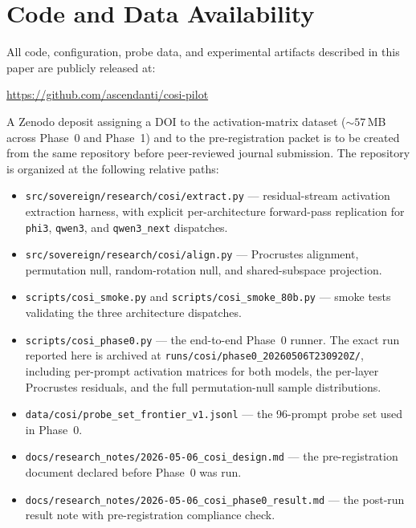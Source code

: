 \section{Code and Data Availability}
\label{sec:availability}

All code, configuration, probe data, and experimental artifacts
described in this paper are publicly released at:
\begin{center}
\url{https://github.com/ascendanti/cosi-pilot}
\end{center}
A Zenodo deposit assigning a DOI to the activation-matrix dataset
($\sim 57$\,MB across Phase~0 and Phase~1) and to the pre-registration
packet is to be created from the same repository before peer-reviewed
journal submission. The repository is organized at the following
relative paths:

\begin{itemize}
    \item \texttt{src/sovereign/research/cosi/extract.py} ---
        residual-stream activation extraction harness, with explicit
        per-architecture forward-pass replication for \texttt{phi3},
        \texttt{qwen3}, and \texttt{qwen3\_next} dispatches.
    \item \texttt{src/sovereign/research/cosi/align.py} ---
        Procrustes alignment, permutation null, random-rotation null,
        and shared-subspace projection.
    \item \texttt{scripts/cosi\_smoke.py} and
        \texttt{scripts/cosi\_smoke\_80b.py} ---
        smoke tests validating the three architecture dispatches.
    \item \texttt{scripts/cosi\_phase0.py} ---
        the end-to-end Phase~0 runner. The exact run reported here is
        archived at
        \texttt{runs/cosi/phase0\_20260506T230920Z/}, including
        per-prompt activation matrices for both models, the per-layer
        Procrustes residuals, and the full permutation-null sample
        distributions.
    \item \texttt{data/cosi/probe\_set\_frontier\_v1.jsonl} ---
        the 96-prompt probe set used in Phase~0.
    \item \texttt{docs/research\_notes/2026-05-06\_cosi\_design.md} ---
        the pre-registration document declared before Phase~0 was run.
    \item \texttt{docs/research\_notes/2026-05-06\_cosi\_phase0\_result.md} ---
        the post-run result note with pre-registration compliance check.
\end{itemize}

